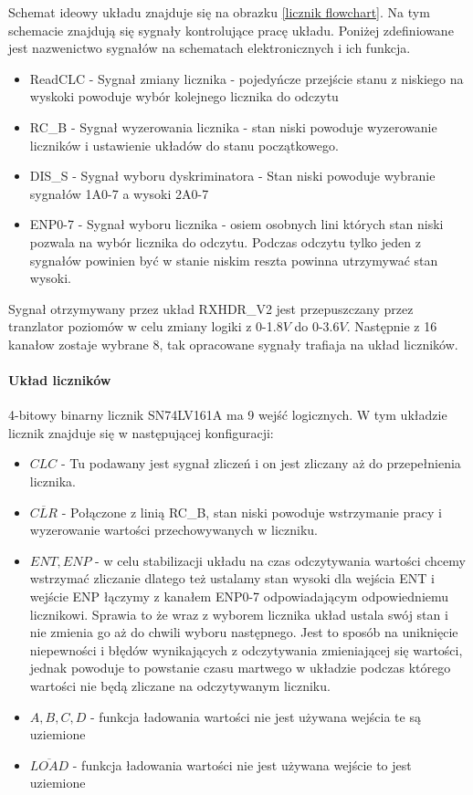 \documentclass[a4paper,12pt]{article}
\begin{document}
Schemat ideowy układu znajduje się na obrazku \ref{licznik flowchart}.
Na tym schemacie znajdują się sygnały kontrolujące pracę układu. Poniżej zdefiniowane jest nazwenictwo sygnałów na schematach elektronicznych i ich funkcja.  
\begin{itemize}
        \item ReadCLC - Sygnał zmiany licznika - pojedyńcze przejście stanu z niskiego na wyskoki powoduje wybór kolejnego licznika do odczytu
        \item RC\_B - Sygnał wyzerowania licznika - stan niski powoduje wyzerowanie liczników i ustawienie układów do stanu początkowego.
        \item DIS\_S - Sygnał wyboru dyskriminatora - Stan niski powoduje wybranie sygnałów 1A0-7 a wysoki 2A0-7
        \item ENP0-7 - Sygnał wyboru licznika - osiem osobnych lini których stan niski pozwala na wybór licznika do odczytu. Podczas odczytu tylko jeden z sygnałów powinien być w stanie niskim reszta powinna utrzymywać stan wysoki. 
\end{itemize}
Sygnał otrzymywany przez układ RXHDR\_V2 jest przepuszczany przez tranzlator poziomów w celu zmiany logiki z 0-1.8$V$ do 0-3.6$V$. Następnie z 16 kanałow zostaje wybrane 8, tak opracowane sygnały trafiaja na układ liczników.

\paragraph{Układ liczników \cite{licznik doc}\cite{slave}}

4-bitowy binarny licznik SN74LV161A ma 9 wejść logicznych. 
W tym układzie licznik znajduje się w następującej konfiguracji:
\begin{itemize}
        \item $CLC$ - Tu podawany jest sygnał zliczeń i on jest zliczany aż do przepełnienia licznika.
        \item $\overline{CLR}$ - Połączone z linią RC\_B, stan niski powoduje wstrzymanie pracy i wyzerowanie wartości przechowywanych w liczniku. 
        \item $ENT,ENP$ - w celu stabilizacji układu na czas odczytywania wartości chcemy wstrzymać zliczanie dlatego też ustalamy stan wysoki dla wejścia ENT i wejście ENP łączymy z kanałem ENP0-7 odpowiadającym odpowiedniemu licznikowi.
        Sprawia to że wraz z wyborem licznika układ ustala swój stan i nie zmienia go aż do chwili wyboru następnego. 
        Jest to sposób na uniknięcie niepewności i błędów wynikających z odczytywania zmieniającej się wartości, jednak powoduje to powstanie czasu martwego w układzie podczas którego wartości nie będą zliczane na odczytywanym liczniku.
        \item $A,B,C,D$ - funkcja ładowania wartości nie jest używana wejścia te są uziemione
        \item $\overline{LOAD}$ - funkcja ładowania wartości nie jest używana wejście to jest uziemione
\end{itemize} 
\end{document}
